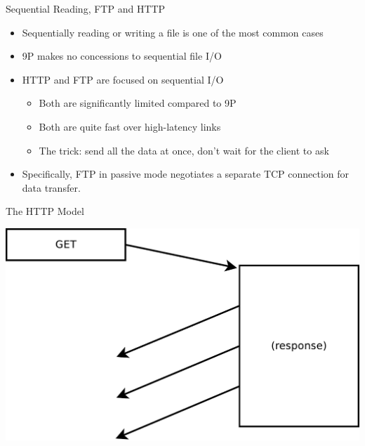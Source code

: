 \documentclass[11pt,compress]{beamer}
\begin{document}
\begin{frame}{Sequential Reading, FTP and HTTP}
\begin{itemize}
	\item Sequentially reading or writing a file is one of the most common cases
	\item 9P makes no concessions to sequential file I/O
	\item HTTP and FTP are focused on sequential I/O
	\begin{itemize}
		\item Both are significantly limited compared to 9P
		\item Both are quite fast over high-latency links
		\item The trick: send all the data at once, don't wait for the client to ask
	\end{itemize}
	\item Specifically, FTP in passive mode negotiates a separate TCP connection for data transfer.\cite{FTPrfc}
\end{itemize}
\end{frame}

\begin{frame}{The HTTP Model}
\begin{center}
\includegraphics[width=1.0\textwidth]{HTTP-get.pdf}
\end{center}
\end{frame}
\end{document}
